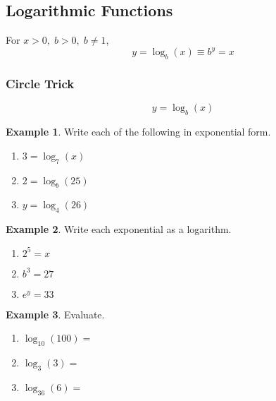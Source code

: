 \documentclass[addpoints,12pt]{exam}
\theoremstyle{definition}
\theoremstyle{break}
\theoremstyle{break}
\newtheorem{example}{Example}[subsection]
\begin{document}
\setcounter{section}{12}
\setcounter{subsection}{1}

\subsection{Logarithmic Functions}
\vspace{.15in}

\begin{definition}[Logarithm]\mbox{}
\vspace{-.15in}
For $x> 0,\; b>0,\; b\neq 1$,
\[ y = \log_b\left(x\right) \equiv b^y = x\]

\end{definition}
\vspace{.15in}

\subsubsection*{Circle Trick}
\vspace{.25in}
\[ y = \log_b\left(x\right) \]
\vspace{.25in}

\begin{example}
Write each of the following in exponential form.
\begin{enumerate}
\item $3 = \log_7{\left(x\right)}$
\vspace{.5in}
\item $2 = \log_b{\left(25\right)}$
\vspace{.5in}
\item $y = \log_4{\left(26\right)}$
\end{enumerate}
\end{example}

\newpage

\begin{example}
Write each exponential as a logarithm.
\begin{enumerate}
\item $2^5 = x$
\vspace{.25in}
\item $b^3 = 27$
\vspace{.25in}
\item $e^y = 33$
\vspace{.25in}
\end{enumerate}
\end{example}

\begin{example}
Evaluate.
\begin{enumerate}
\item $\log_{10}{\left(100\right)} = $
\vspace{.25in}
\item $\log_{3}{\left(3\right)} = $
\vspace{.25in}
\item $\log_{36}{\left(6\right)} = $
\vspace{.25in}
\end{enumerate}
\end{example}
\end{document}
